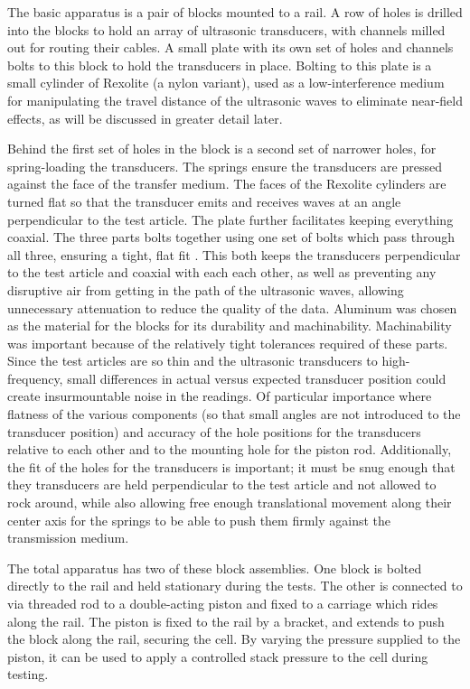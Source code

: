 
The basic apparatus is a pair of blocks mounted to a rail. A row of holes is drilled into the blocks to hold an array of ultrasonic transducers, with channels milled out for routing their cables. A small plate with its own set of holes and channels bolts to this block to hold the transducers in place. Bolting to this plate is a small cylinder of Rexolite (a nylon variant), used as a low-interference medium for manipulating the travel distance of the ultrasonic waves to eliminate near-field effects, as will be discussed in greater detail later.

Behind the first set of holes in the block is a second set of narrower holes, for spring-loading the transducers. The springs ensure the transducers are pressed against the face of the transfer medium. The faces of the Rexolite cylinders are turned flat so that the transducer emits and receives waves at an angle perpendicular to the test article.  The plate further facilitates keeping everything coaxial. The three parts bolts together using one set of bolts which pass through all three, ensuring a tight, flat fit . This both keeps the transducers perpendicular to the test article and coaxial with each each other, as well as preventing any disruptive air from getting in the path of the ultrasonic waves, allowing unnecessary attenuation to reduce the quality of the data. Aluminum was chosen as the material for the blocks for its durability and machinability. Machinability was important because of the relatively tight tolerances required of these parts. Since the test articles are so thin and the ultrasonic transducers to high-frequency, small differences in actual versus expected transducer position could create insurmountable noise in the readings. Of particular importance where flatness of the various components (so that small angles are not introduced to the transducer position) and accuracy of the hole positions for the transducers relative to each other and to the mounting hole for the piston rod. Additionally, the fit of the holes for the transducers is important; it must be snug enough that they transducers are held perpendicular to the test article and not allowed to rock around, while also allowing free enough translational movement along their center axis for the springs to be able to push them firmly against the transmission medium.

The total apparatus has two of these block assemblies. One block is bolted directly to the rail and held stationary during the tests. The other is connected to via threaded rod to a double-acting piston and fixed to a carriage which rides along the rail. The piston is fixed to the rail by a bracket, and extends to push the block along the rail, securing the cell. By varying the pressure supplied to the piston, it can be used to apply a controlled stack pressure to the cell during testing.

